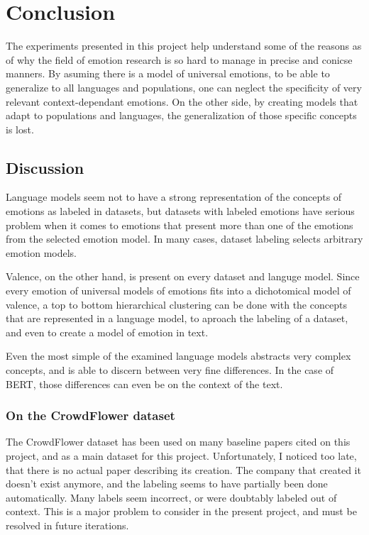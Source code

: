 \chapter{Conclusion}\label{chap:Conclusion}
The experiments presented in this project help understand some of the reasons as of why the field of emotion research is so hard to manage in precise and conicse manners. By asuming there is a model of universal emotions, to be able to generalize to all languages and populations, one can neglect the specificity of very relevant context-dependant emotions. On the other side, by creating models that adapt to populations and languages, the generalization of those specific concepts is lost.

\section{Discussion}\label{sec:Discussion}
Language models seem not to have a strong representation of the concepts of emotions as labeled in datasets, but datasets with labeled emotions have serious problem when it comes to emotions that present more than one of the emotions from the selected emotion model. In many cases, dataset labeling selects arbitrary emotion models.

Valence, on the other hand, is present on every dataset and languge model. Since every emotion of universal models of emotions fits into a dichotomical model of valence, a top to bottom hierarchical clustering can be done with the concepts that are represented in a language model, to aproach the labeling of a dataset, and even to create a model of emotion in text.

Even the most simple of the examined language models abstracts very complex concepts, and is able to discern between very fine differences. In the case of BERT, those differences can even be on the context of the text.

\subsection{On the CrowdFlower dataset}
The CrowdFlower dataset has been used on many baseline papers cited on this project, and as a main dataset for this project. Unfortunately, I noticed too late, that there is no actual paper describing its creation. The company that created it doesn't exist anymore, and the labeling seems to have partially been done automatically. Many labels seem incorrect, or were doubtably labeled out of context. This is a major problem to consider in the present project, and must be resolved in future iterations.

